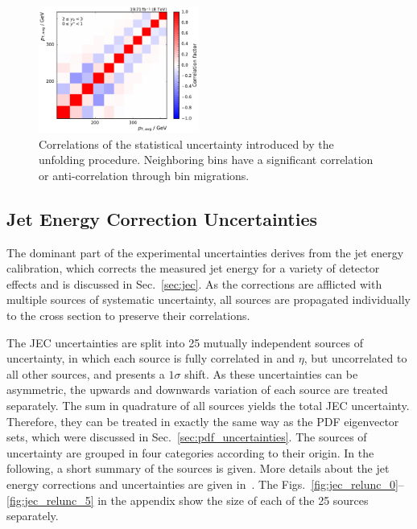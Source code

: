 \begin{figure}[htbp]
    \includegraphics[width=0.47\textwidth]{figures/measurement/unf_nlo_corr_yb2ys0.pdf}
    \caption[Correlations of statistical uncertainty]{Correlations of the
        statistical uncertainty introduced by the unfolding procedure.
        Neighboring bins have a significant correlation or anti-correlation
        through bin migrations.}
    \label{fig:corr_unfolding_nlo}
\end{figure}

\subsection{Jet Energy Correction Uncertainties}

The dominant part of the experimental uncertainties derives from the jet energy
calibration, which corrects the measured jet energy for a variety of detector
effects and is discussed in Sec.~\ref{sec:jec}. As the corrections are afflicted
with multiple sources of systematic uncertainty, all sources are propagated
individually to the cross section to preserve their correlations.

The JEC uncertainties are split into 25 mutually independent sources of
uncertainty, in which each source is fully correlated in \pt and $\eta$,
but uncorrelated to all other sources, and presents a $1\sigma$
shift. As these uncertainties can be asymmetric, the upwards and downwards
variation of each source are treated separately. The sum in quadrature of all
sources yields the total JEC uncertainty. Therefore, they can be treated
in exactly the same way as the PDF eigenvector sets, which were discussed in
Sec.~\ref{sec:pdf_uncertainties}. The sources of uncertainty are grouped in four
categories according to their origin. In the following, a short summary of the
sources is given. More details about the jet energy corrections and
uncertainties are given in~\cite{jec_8tev}. The
Figs.~\ref{fig:jec_relunc_0}--\ref{fig:jec_relunc_5} in the appendix show the
size of each of the 25 sources separately.

